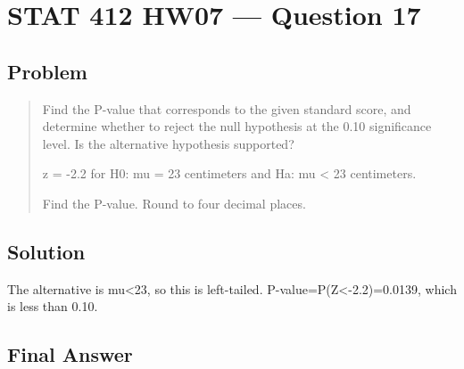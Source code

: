 \documentclass[11pt]{article}
\begin{document}
\section*{STAT 412 HW07 --- Question 17}

\subsection*{Problem}

\begin{quote}
Find the P-value that corresponds to the given standard score, and determine whether to reject the null hypothesis at the 0.10 significance level. Is the alternative hypothesis supported?

z = -2.2 for H0: mu = 23 centimeters and Ha: mu < 23 centimeters.

Find the P-value. Round to four decimal places.
\end{quote}

\subsection*{Solution}

The alternative is mu<23, so this is left-tailed. P-value=P(Z<-2.2)=0.0139, which is less than 0.10.

\subsection*{Final Answer}

\end{document}
